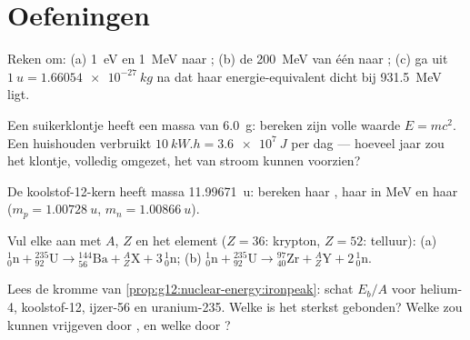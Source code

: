 \section{Oefeningen}

\begin{exercise}[$\star$]\label{exo:g12:nuclear-energy:1}
Reken om: (a) \qty{1}{eV} en \qty{1}{MeV} naar ; (b) de \qty{200}{MeV}
van één  naar ; (c) ga uit
$\qty{1}{u} = \qty{1.66054e-27}{kg}$ na dat haar energie-equivalent dicht bij
\qty{931.5}{MeV} ligt.
\end{exercise}

\begin{exercise}[$\star$]\label{exo:g12:nuclear-energy:2}
Een suikerklontje heeft een massa van \qty{6.0}{g}: bereken zijn volle waarde
$E = mc^2$. Een huishouden verbruikt $\qty{10}{kW.h} = \qty{3.6e7}{J}$ per
dag --- hoeveel jaar zou het klontje, volledig omgezet, het van stroom kunnen
voorzien?
\end{exercise}

\begin{exercise}[$\star$]\label{exo:g12:nuclear-energy:3}
De koolstof-12-kern heeft massa \qty{11.99671}{u}: bereken haar ,
haar  in \unit{MeV} en haar 
($m_p = \qty{1.00728}{u}$, $m_n = \qty{1.00866}{u}$).
\end{exercise}

\begin{exercise}[$\star$]\label{exo:g12:nuclear-energy:4}
Vul elke  aan met $A$, $Z$ en het element ($Z = 36$: krypton,
$Z = 52$: telluur):
(a) ${}^{1}_{0}\mathrm{n} + {}^{235}_{92}\mathrm{U} \to
{}^{144}_{56}\mathrm{Ba} + {}^{A}_{Z}\mathrm{X} + 3\,{}^{1}_{0}\mathrm{n}$;
(b) ${}^{1}_{0}\mathrm{n} + {}^{235}_{92}\mathrm{U} \to
{}^{97}_{40}\mathrm{Zr} + {}^{A}_{Z}\mathrm{Y} + 2\,{}^{1}_{0}\mathrm{n}$.
\end{exercise}

\begin{exercise}[$\star$]\label{exo:g12:nuclear-energy:5}
Lees de kromme van \cref{prop:g12:nuclear-energy:ironpeak}: schat $E_b/A$ voor
helium-4, koolstof-12, ijzer-56 en uranium-235. Welke is het sterkst gebonden?
Welke zou  kunnen vrijgeven door , en welke door
?
\end{exercise}

